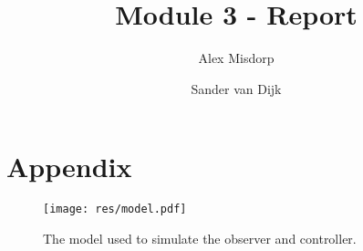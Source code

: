 \documentclass[final]{scrreprt} %
\title{Module 3 - Report}
\author{Alex {Misdorp} \and Sander {van Dijk}}
\begin{document}
\chapter*{Appendix}

\begin{figure}[H]
	\vspace*{-1.8cm}
	\centering    	
    	\texttt{[image: res/model.pdf]}
    	\caption{The model used to simulate the observer and controller.}
    	\label{app:model}
\end{figure}
\end{document}
